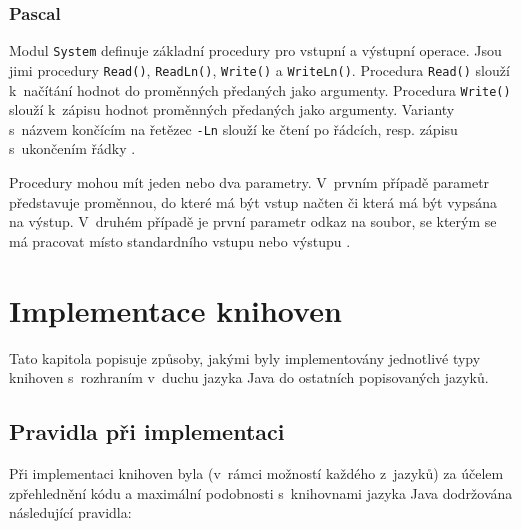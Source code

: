 \documentclass[czech,BP]{thesiskiv}
\begin{document}
\subsection{Pascal}
Modul \texttt{System} definuje základní procedury pro vstupní a výstupní operace. Jsou jimi procedury \texttt{Read()}, \texttt{ReadLn()}, \texttt{Write()} a \texttt{WriteLn()}. Procedura \texttt{Read()} slouží k~načítání hodnot do proměnných předaných jako argumenty. Procedura \texttt{Write()} slouží k~zápisu hodnot proměnných předaných jako argumenty. Varianty s~názvem končícím na řetězec \texttt{-Ln} slouží ke čtení po řádcích, resp. zápisu s~ukončením řádky \cite{pas-guide-system, pas-guide-read, pas-guide-write, pas-guide-readln, pas-guide-writeln}.\par
Procedury mohou mít jeden nebo dva parametry. V~prvním případě parametr představuje proměnnou, do které má být vstup načten či která má být vypsána na výstup. V~druhém případě je první parametr odkaz na soubor, se kterým se má pracovat místo standardního vstupu nebo výstupu \cite{pas-guide-read, pas-guide-write, pas-guide-readln, pas-guide-writeln}.

\chapter{Implementace knihoven}
Tato kapitola popisuje způsoby, jakými byly implementovány jednotlivé typy knihoven s~rozhraním v~duchu jazyka Java do ostatních popisovaných jazyků.

\section{Pravidla při implementaci}
Při implementaci knihoven byla (v~rámci možností každého z~jazyků) za účelem zpřehlednění kódu a maximální podobnosti s~knihovnami jazyka Java dodržována následující pravidla:
\end{document}
